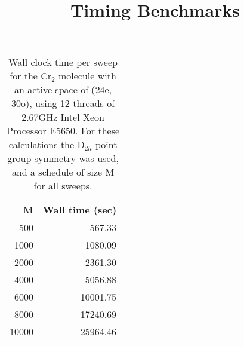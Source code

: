 \documentclass[letterpaper,12pt,notitlepage]{article}
\title{Timing Benchmarks}
\begin{document}

\begin{table}
\begin{center}
 \begin{tabular}{rr}
  \hline
  \hline
M& Wall time (sec)\\
\hline
500     &567.33\\
1000	&1080.09\\
2000	&2361.30\\
4000	&5056.88\\
6000	&10001.75\\
8000	&17240.69\\
10000	&25964.46\\
\hline
  \hline
 \end{tabular}
\end{center}
\caption{Wall clock time per sweep for the Cr$_2$ molecule with an active space
of (24e, 30o), using 12 threads of 2.67GHz Intel Xeon Processor E5650. For
these calculations the D$_{2h}$ point group symmetry was used, and a schedule
of size M for all sweeps.} \label{tab:timing}
\end{table}
\end{document}
